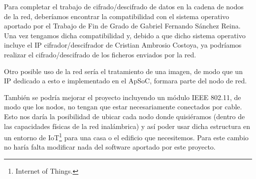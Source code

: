 Para completar el trabajo de cifrado/descifrado de datos en la cadena de nodos de la red, deberíamos encontrar la compatibilidad con el sistema operativo aportado por el Trabajo de Fin de Grado de Gabriel Fernando Sánchez Reina. Una vez tengamos dicha compatibilidad y, debido a que dicho sistema operativo incluye el IP cifrador/descifrador de Cristian Ambrosio Costoya, ya podríamos realizar el cifrado/descifrado de los ficheros enviados por la red.

Otro posible uso de la red sería el tratamiento de una imagen, de modo que un IP dedicado a esto e implementado en el ApSoC, formara parte del nodo de red.

También se podría mejorar el proyecto incluyendo un módulo IEEE 802.11, de modo que los nodos, no tengan que estar necesariamente conectados por cable. Esto nos daría la posibilidad de ubicar cada nodo donde quisiéramos (dentro de las capacidades físicas de la red inalámbrica) y así poder usar dicha estructura en un entorno de IoT\footnote{Internet of Things.} para una casa o el edificio que necesitemos. Para este cambio no haría falta modificar nada del software aportado por este proyecto.
